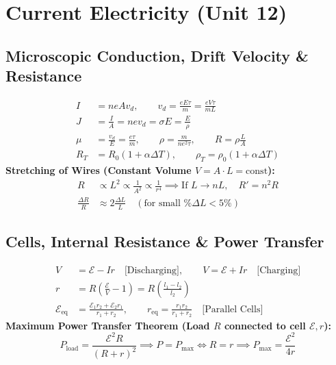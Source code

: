 \documentclass[10pt,twoside,openright]{book}
\begin{document}
\newpage

\section{Current Electricity (Unit 12)}

\subsection{Microscopic Conduction, Drift Velocity \& Resistance}

\begin{formulabox}
\begin{align}
  I &= n e A v_d, \qquad v_d = \frac{e E \tau}{m} = \frac{e V \tau}{m L} \\
  J &= \frac{I}{A} = n e v_d = \sigma E = \frac{E}{\rho} \\
  \mu &= \frac{v_d}{E} = \frac{e\tau}{m}, \qquad \rho = \frac{m}{n e^2 \tau}, \qquad R = \rho\frac{L}{A} \\
  R_T &= R_0(1 + \alpha\Delta T), \qquad \rho_T = \rho_0(1 + \alpha\Delta T)
\end{align}
\textbf{Stretching of Wires (Constant Volume $V = A\cdot L = \text{const}$):}
\begin{align}
  R &\propto L^2 \propto \frac{1}{A^2} \propto \frac{1}{r^4} \implies \text{If } L \to nL, \quad R' = n^2 R \\
  \frac{\Delta R}{R} &\approx 2\frac{\Delta L}{L} \quad (\text{for small } \%\Delta L < 5\%)
\end{align}
\end{formulabox}

\subsection{Cells, Internal Resistance \& Power Transfer}

\begin{formulabox}
\begin{align}
  V &= \mathcal{E} - Ir \quad \text{[Discharging]}, \qquad V = \mathcal{E} + Ir \quad \text{[Charging]} \\
  r &= R\left(\frac{\mathcal{E}}{V} - 1\right) = R\left(\frac{l_1 - l_2}{l_2}\right) \\
  \mathcal{E}_{\text{eq}} &= \frac{\mathcal{E}_1 r_2 + \mathcal{E}_2 r_1}{r_1 + r_2}, \qquad r_{\text{eq}} = \frac{r_1 r_2}{r_1 + r_2} \quad \text{[Parallel Cells]}
\end{align}
\textbf{Maximum Power Transfer Theorem (Load $R$ connected to cell $\mathcal{E}, r$):}
\begin{equation}
  P_{\text{load}} = \frac{\mathcal{E}^2 R}{(R + r)^2} \implies P = P_{\max} \iff R = r \implies P_{\max} = \frac{\mathcal{E}^2}{4r}
\end{equation}
\end{formulabox}
\end{document}
